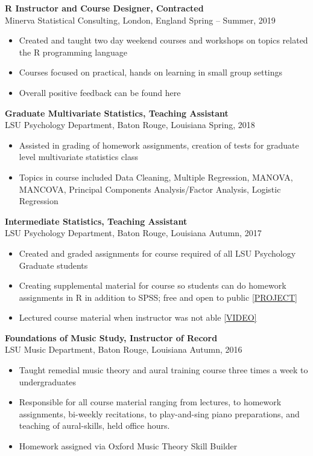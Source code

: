 \textbf{R Instructor and Course Designer, Contracted}
\\Minerva Statistical Consulting, London, England \hfill Spring -- Summer, 2019 
\begin{itemize} \itemsep -2pt %
\item Created and taught two day weekend courses and workshops on topics related the R programming language
\item Courses focused on practical, hands on learning in small group settings
\item Overall positive feedback can be found here
\end{itemize}

\textbf{Graduate Multivariate Statistics, Teaching Assistant}
\\LSU Psychology Department, Baton Rouge, Louisiana \hfill Spring, 2018 
\begin{itemize} \itemsep -2pt %
\item Assisted in grading of homework assignments, creation of tests for graduate level multivariate statistics class
\item Topics in course included Data Cleaning, Multiple Regression, MANOVA, MANCOVA, Principal Components Analysis/Factor Analysis, Logistic Regression
\end{itemize}

\textbf{Intermediate Statistics, Teaching Assistant}
\\LSU Psychology Department, Baton Rouge, Louisiana \hfill Autumn, 2017 
\begin{itemize} \itemsep -2pt %
\item Created and graded assignments for course required of all LSU Psychology Graduate students   
\item Creating supplemental material for course so students can do homework assignments in R in addition to SPSS; free and open to public \href{https://davidjohnbaker1.github.io/rForPsychHandbook/}{ [PROJECT] }
\item Lectured course material when instructor was not able \href{https://youtu.be/MFUBbi2tcyU}{ [VIDEO] } 
\end{itemize}

\textbf{Foundations of Music Study, Instructor of Record}
\\LSU Music Department, Baton Rouge, Louisiana \hfill Autumn, 2016 
\begin{itemize} \itemsep -2pt %
\item Taught remedial music theory and aural training course three times a week to undergraduates  
\item Responsible for all course material ranging from lectures, to homework assignments, bi-weekly recitations, to play-and-sing piano preparations, and teaching of aural-skills, held office hours.
\item Homework assigned via Oxford Music Theory Skill Builder
\end{itemize}

